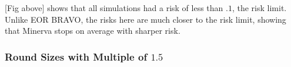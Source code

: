 \documentclass{article}
\begin{document}
[Fig above] shows that all simulations had a risk of less than 
$.1$, the risk limit. 
Unlike EOR BRAVO, the risks here are much closer to the risk limit,
showing that Minerva stops on average with sharper risk.

\subsubsection{Round Sizes with Multiple of $1.5$}


\end{document}
